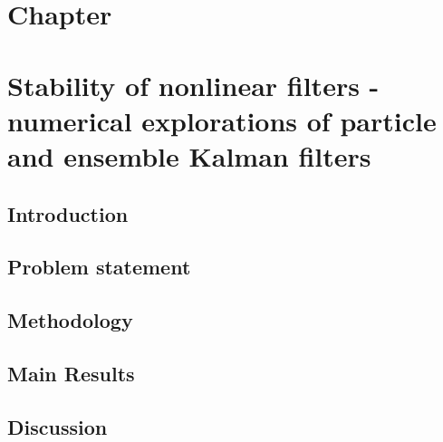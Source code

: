 \chapter*{Chapter }
\textit{}
\newpage

\chapter{ 
Stability of nonlinear filters - numerical explorations of particle and ensemble Kalman filters
}
\section{Introduction} \label{sec-intro--numerical-fs}


\section{Problem statement} \label{sec-prob--numerical-fs}


\section{Methodology} \label{sec-method--numerical-fs}


\section{Main Results} \label{sec-res--numerical-fs}

\section{Discussion} \label{sec-disc--numerical-fs}



